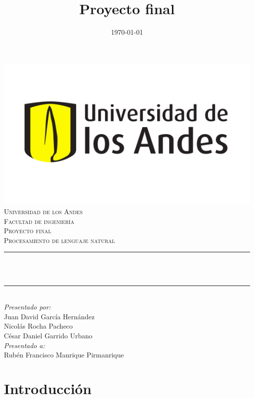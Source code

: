 \documentclass[12pt]{article}
\title{Proyecto final}
\date{\today}
\makeatletter
\let\thetitle\@title
\makeatother
\begin{document}
    \pagestyle{fancy}
    \fancyhf{}

    \renewcommand{\headrulewidth}{0.7pt}
\fancyfoot[R]{\thepage}

\begin{titlepage}
	\centering
    \includegraphics[scale = 0.45]{images/Logo.png}\\[0.5 cm]	%
    \textsc{\large Universidad de los Andes\\
        \vspace{0.2cm} 
        Facultad de ingeniería\\
        \vspace{0.3cm} 
        Proyecto final}\\[2.0 cm]	%
	\textsc{\Large Procesamiento de lenguaje natural}\\[0.5 cm]
	\rule{\linewidth}{0.2 mm} \\[0.4 cm]
	{ \LARGE \bfseries \thetitle}\\
	\rule{\linewidth}{0.2 mm} \\[1.5 cm]
	
	\large
			\emph{Presentado por:} \\
			Juan David García Hernández\\
			Nicolás Rocha Pacheco\\
			César Daniel Garrido Urbano\\
	\vfill
	\large
			\emph{Presentado a:}\\
			Rubén Francisco Manrique Pirmanrique\\
\end{titlepage}

\thispagestyle{empty}
\tableofcontents
\pagebreak

\setcounter{page}{1}
\section*{Introducción}





\newpage


\end{document}
